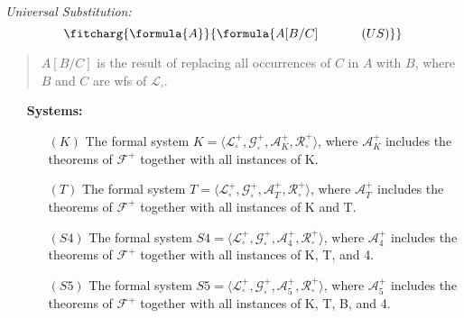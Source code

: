 \documentclass[a4paper, 11pt]{article} %
\newcommand{\tuple}[1]{\langle#1\rangle} %
\renewcommand{\L}[0]{\mathcal{L}}
\begin{document}
\begin{multicols}{2}\it
Universal Substitution:\vspace{-.05in}
\begin{equation*}
\fitcharg{
\formula{A}
}{
\formula{A[B/C] \hspace*{.477in}(US)}
}
\end{equation*}

\vspace*{-.07in}

\begin{quote}\small
$A[B/C]$ is the result of replacing all occurrences of $C$ in $A$ with $B$, where $B$ and $C$ are wfs of $\L_\square$.
\end{quote}

\end{multicols}
\vspace{-.05in}
	
	
\begin{enumerate}[leftmargin=1.2in,labelsep=.15in] %
\item[\bf Systems:]
	\begin{enumerate}
	\item[$(K)$] The formal system $K=\tuple{\L_\square^+,\mathcal{G}_\square^+,\mathcal{A}_K^+,\mathcal{R}_\square^+}$, where $\mathcal{A}_K^+$ includes the theorems of $\mathcal{F}^+$ together with all instances of K.
	\item[$(T)$] The formal system $T=\tuple{\L_\square^+,\mathcal{G}_\square^+,\mathcal{A}_T^+,\mathcal{R}_\square^+}$, where $\mathcal{A}_T^+$ includes the theorems of $\mathcal{F}^+$ together with all instances of K and T.
	\item[$(S4)$] The formal system $S4=\tuple{\L_\square^+,\mathcal{G}_\square^+,\mathcal{A}_4^+,\mathcal{R}_\square^+}$, where $\mathcal{A}_{4}^+$ includes the theorems of $\mathcal{F}^+$ together with all instances of K, T, and 4.
	\item[$(S5)$] The formal system $S5=\tuple{\L_\square^+,\mathcal{G}_\square^+,\mathcal{A}_5^+,\mathcal{R}_\square^+}$, where $\mathcal{A}_{5}^+$ includes the theorems of $\mathcal{F}^+$ together with all instances of K, T, B, and 4.
	\end{enumerate}
\end{enumerate}
\end{document}
